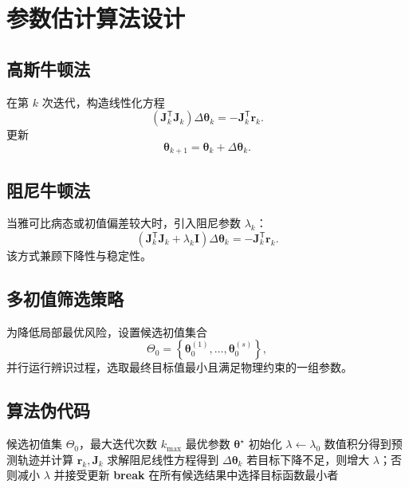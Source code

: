 \chapter{参数估计算法设计}

\section{高斯牛顿法}
在第 $k$ 次迭代，构造线性化方程
\[
\left(\mathbf{J}_k^\mathsf{T}\mathbf{J}_k\right)\Delta\boldsymbol{\theta}_k
=-\mathbf{J}_k^\mathsf{T}\mathbf{r}_k.
\]
更新
\[
\boldsymbol{\theta}_{k+1}=\boldsymbol{\theta}_k+\Delta\boldsymbol{\theta}_k.
\]

\section{阻尼牛顿法}
当雅可比病态或初值偏差较大时，引入阻尼参数 $\lambda_k$：
\[
\left(\mathbf{J}_k^\mathsf{T}\mathbf{J}_k+\lambda_k\mathbf{I}\right)\Delta\boldsymbol{\theta}_k
=-\mathbf{J}_k^\mathsf{T}\mathbf{r}_k.
\]
该方式兼顾下降性与稳定性。

\section{多初值筛选策略}
为降低局部最优风险，设置候选初值集合
\[
\Theta_0=\left\{\boldsymbol{\theta}_0^{(1)},\ldots,\boldsymbol{\theta}_0^{(s)}\right\},
\]
并行运行辨识过程，选取最终目标值最小且满足物理约束的一组参数。

\section{算法伪代码}
\begin{algorithm}[H]
\caption{多初值阻尼高斯牛顿辨识}
\begin{algorithmic}[1]
\Require 候选初值集 $\Theta_0$，最大迭代次数 $k_{\max}$
\Ensure 最优参数 $\boldsymbol{\theta}^{\star}$
\State 初始化 $\lambda\gets\lambda_0$
\State 数值积分得到预测轨迹并计算 $\mathbf{r}_k,\mathbf{J}_k$
\State 求解阻尼线性方程得到 $\Delta\boldsymbol{\theta}_k$
\State 若目标下降不足，则增大 $\lambda$；否则减小 $\lambda$ 并接受更新
\State \textbf{break}
\EndIf
\EndFor
\EndFor
\State 在所有候选结果中选择目标函数最小者
\end{algorithmic}
\end{algorithm}
